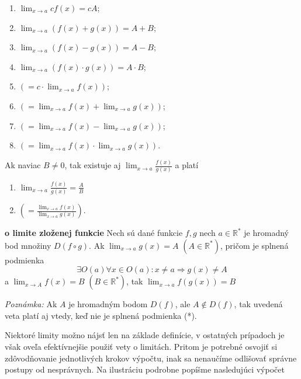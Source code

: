 \begin{multicols}{2}
\begin{enumerate}[label=]
    \item $\lim_{x \rightarrow a} cf(x)=cA$;
    \item $\lim_{x \rightarrow a} (f(x)+g(x))=A+B$;
    \item $\lim_{x \rightarrow a} (f(x)-g(x))=A-B$;
    \item $\lim_{x \rightarrow a} (f(x) \cdot g(x))=A \cdot B$;
    \item $(=c \cdot \lim_{x \rightarrow a} f(x))$;
    \item $(=\lim_{x \rightarrow a} f(x)+\lim_{x \rightarrow a} g(x))$;
    \item $(=\lim_{x \rightarrow a} f(x)-\lim_{x \rightarrow a} g(x))$;
    \item $(=\lim_{x \rightarrow a} f(x) \cdot \lim_{x \rightarrow a} g(x))$.
\end{enumerate}
\end{multicols}
Ak naviac $B \neq 0$, tak existuje aj $\lim_{x \rightarrow a} \frac{f(x)}{g(x)}$ a platí

\begin{multicols}{2}
\begin{enumerate}[label=]
\item $\lim_{x \rightarrow a} \frac{f(x)}{g(x)}=\frac{A}{B}$
\item $(=\frac{\lim_{x \rightarrow a} f(x)}{\lim_{x \rightarrow a} g(x)})$.
\end{enumerate}
\end{multicols}

\begin{veta}
\textbf{o limite zloženej funkcie}
Nech sú dané funkcie $f, g$ nech $a \in \mathbb{R^*}$ je hromadný bod množiny
$D(f \circ g)$. Ak $\lim_{x \rightarrow a} g(x) = A$ $(A \in \mathbb{R^*})$,
pričom je splnená podmienka
\[
  \exists O(a)\forall x \in O(a): x \neq a \Rightarrow g(x) \neq A
\]
a $\lim_{x \rightarrow A} f(x) = B$  $(B \in \mathbb{R^*})$, tak $\lim_{x
\rightarrow a} f(g(x)) = B$
\end{veta}

\textit{Poznámka:}
Ak $A$ je hromadným bodom $D(f)$, ale $A \notin D(f)$, tak uvedená veta platí aj
vtedy, keď nie je splnená podmienka (*).

Niektoré limity možno nájsť len na základe definície, v ostatných prípadoch je
však oveľa efektívnejšie použiť vety o limitách. Pritom je potrebné osvojiť si
zdôvodňovanie jednotlivých krokov výpočtu, inak sa nenaučíme odlišovať správne
postupy od nesprávnych. Na ilustráciu podrobne popíšme nasledujúci výpočet

